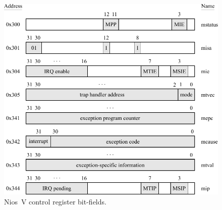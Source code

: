 \documentclass[11pt, twoside, pdftex]{article}
\begin{document}
\begin{itemize}
\begin{itemize}
\begin{figure}[t]
   \begin{center}
      \includegraphics[scale=.9]{figures/control_registers.pdf}
   \caption{Nios~V control register bit-fields.} 
	 \label{fig:control}
	 \end{center}
\end{figure}


\end{itemize}
\end{itemize}
\end{document}
